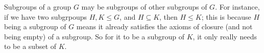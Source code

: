 \documentclass[12pt]{article}
\begin{document}
    Subgroups of a group $G$ may
    be subgroups of other subgroups of $G$.
    For instance, if we have two subgrpoups $H, K \leqslant G$,
    and $H \subseteq K$,
    then $H \leqslant K$;
    this is because $H$ being a subgroup of $G$
    means it already satisfies the axioms of closure
    (and not being empty) of a subgroup.
    So for it to be a subgroup of $K$,
    it only really needs to be a subset of $K$. \\
    
\end{document}
